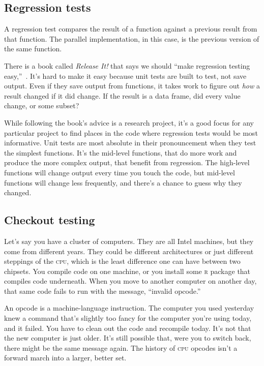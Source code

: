 \documentclass[fleqn,10pt]{olplainarticle}
\newcommand{\rlang}{\textsc{r}\xspace}
\newcommand{\cpu}{\textsc{cpu}\xspace}
\begin{document}
\subsection{Regression tests}
A regression test compares the result of a function against a previous
result from that function. The parallel implementation, in this case,
is the previous version of the same function.

There is a book called \emph{Release It!} that says we should
``make regression testing easy,''~\citep{nygard2018release}. It's hard to make it easy
because unit tests are built to test, not save output. Even if
they save output from functions, it takes work to figure out
\emph{how} a result changed if it did change. If the result
is a data frame, did every value change, or some subset?

While following the book's advice is a research project,
it's a good focus for any particular project to find places in the
code where regression tests would be most informative. Unit tests are
most absolute in their pronouncement when they test the simplest
functions. It's the mid-level functions, that do more work
and produce the more complex output, that benefit from regression.
The high-level functions will change output every time you touch
the code, but mid-level functions will change less frequently,
and there's a chance to guess why they changed.


\subsection{Checkout testing}\label{sec:test-compiler}

Let's say you have a cluster of computers. They are all Intel machines,
but they come from different years. They could be different architectures
or just different steppings of the \cpu, which is the least difference
one can have between two chipsets. You compile code on one machine,
or you install some \rlang package that compiles code underneath. When
you move to another computer on another day, that same code fails
to run with the message, ``invalid opcode.''

An opcode is a machine-language instruction. The computer you used
yesterday knew a command that's slightly too fancy for the computer
you're using today, and it failed. You have to clean out the code
and recompile today. It's not that the new computer is just older.
It's still possible that, were you to switch back, there might be
the same message again. The history of \cpu opcodes isn't a forward
march into a larger, better set.
\end{document}
